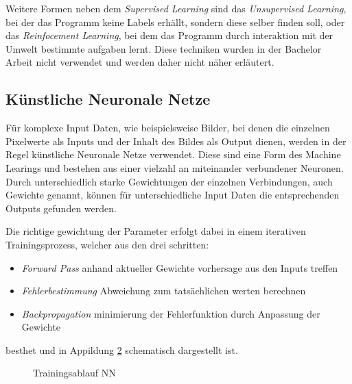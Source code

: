 Weitere Formen neben dem \textit{Supervised Learning} sind das 
\textit{Unsupervised Learning}, bei der das Programm keine Labels 
erhällt, sondern diese selber finden 
soll, oder das \textit{Reinfocement Learning}, bei dem das Programm 
durch interaktion mit der Umwelt bestimmte aufgaben lernt.
Diese techniken wurden in der Bachelor Arbeit nicht verwendet 
und werden daher nicht näher erläutert.


\subsection{Künstliche Neuronale Netze} \label{subsec:nn}

Für komplexe Input Daten, wie beispielsweise Bilder, bei denen 
die einzelnen Pixelwerte als Inputs und der Inhalt des Bildes als 
Output dienen, werden in der Regel künstliche Neuronale Netze verwendet.
Diese sind eine Form des Machine Learings und bestehen aus einer 
vielzahl an miteinander verbundener Neuronen. Durch unterschiedlich 
starke Gewichtungen der einzelnen Verbindungen, auch Gewichte genannt, 
können für unterschiedliche Input Daten die entsprechenden Outputs 
gefunden werden.

\begin{figure}[H]
    \centering
    \label{fig:nn}
    \def\svgwidth{0.5\columnwidth}
    \footnotesize
    
\end{figure}

Die richtige gewichtung der Parameter erfolgt dabei in einem iterativen Trainingsprozess, 
welcher aus den drei schritten:


\begin{itemize}
    \item \textit{Forward Pass} anhand aktueller Gewichte vorhersage aus den Inputs treffen
    \item \textit{Fehlerbestimmung} Abweichung zum tatsächlichen werten berechnen
    \item \textit{Backpropagation} minimierung der Fehlerfunktion durch Anpassung der Gewichte
\end{itemize}

besthet und in Appildung \ref{fig:train} schematisch dargestellt ist.



\begin{figure}[H]
    \centering
    \label{fig:train}
    
    \caption{Trainingsablauf NN}
\end{figure}




